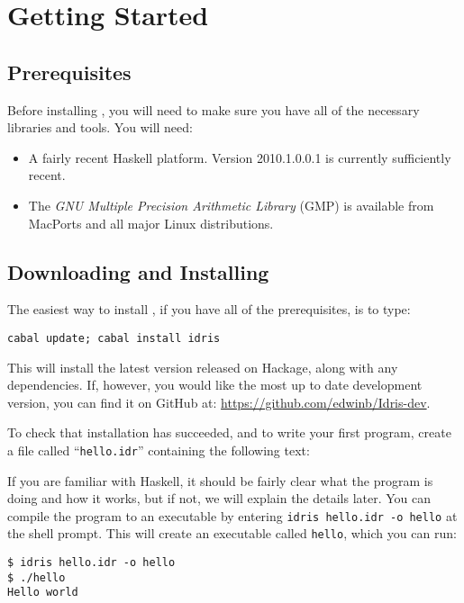 \section{Getting Started}

\subsection{Prerequisites} 

Before installing \Idris{}, you will need to make sure you have all of the necessary libraries and tools.
You will need:

\begin{itemize}
\item A fairly recent Haskell platform. Version 2010.1.0.0.1 is currently sufficiently recent.
\item The \emph{GNU Multiple Precision Arithmetic Library} (GMP) is available from MacPorts and all major Linux distributions.
\end{itemize}

\subsection{Downloading and Installing}

The easiest way to install \Idris{}, if you have all of the prerequisites, is to type:

\begin{lstlisting}[style=stdout]
cabal update; cabal install idris
\end{lstlisting}

\noindent
This will install the latest version released on Hackage, along with any dependencies. 
If, however, you would like the most up to date development version, you can find it on GitHub at: \url{https://github.com/edwinb/Idris-dev}.

To check that installation has succeeded, and to write your first \Idris{} program, create a file called ``\texttt{hello.idr}'' containing the following text:


\noindent
If you are familiar with Haskell, it should be fairly clear what the program is doing and how it works, but if not, we will explain the details later.
You can compile the program to an executable by entering \texttt{idris hello.idr -o hello} at the shell prompt. 
This will create an executable called \texttt{hello}, which you can run:

\begin{lstlisting}[style=stdout]
$ idris hello.idr -o hello
$ ./hello
Hello world
\end{lstlisting}

